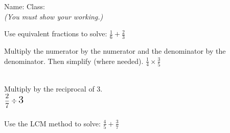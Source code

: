 \documentclass{article}
\date{}
\begin{document}
\fontsize{13}{15} \selectfont %

 \qquad Name: \hspace{5cm}  Class: \hspace{5cm}  \\
\vspace{10pt} 
\textit{(You must show your working.)  }
\vspace{5pt}

\hline
\vspace{10pt}
 \quad  Use equivalent fractions to solve: $ \displaystyle \frac{1}{6} + \displaystyle \frac{2}{3} $ \\
\vspace{10pt}

\hline
\vspace{10pt}
 \quad Multiply the numerator by the numerator and the denominator by the denominator. 
Then simplify (where needed).
$ \displaystyle \frac{1}{4} \times \displaystyle \frac{3}{5} $ \\
\vspace{10pt}


\hline
\vspace{10pt}
\\[10pt] %
 \quad Multiply by the reciprocal of 3. \\ 
\vspace{20pt}
\( \displaystyle \frac{2}{7} \div \text{\Large 3} \) \\
\\[10pt] %



\hline
\vspace{10pt}
 \quad Use the LCM method to solve: $ \displaystyle\frac{4}{5} + \displaystyle \frac{3}{7} $ \\
\vspace{10pt}
\end{document}
